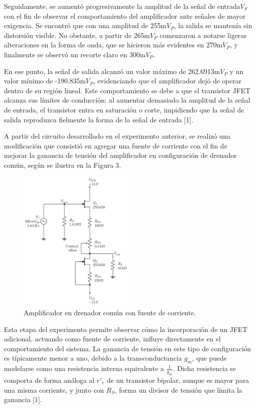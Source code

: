 \documentclass[journal]{IEEEtran}
\begin{document}
\par Seguidamente, se aumentó progresivamente la amplitud de la señal de entrada\( V_S \) con el fin de observar el comportamiento del amplificador ante señales de mayor exigencia. Se encontró que con una amplitud de 255m\( V_P \), la salida se mantenía sin distorsión visible. No obstante, a partir de 265m\( V_P \) comenzaron a notarse ligeras alteraciones en la forma de onda, que se hicieron más evidentes en 270m\( V_P \), y finalmente se observó un recorte claro en 300m\( V_P \).
\par En ese punto, la señal de salida alcanzó un valor máximo de 262.6913m\( V_P \) y un valor mínimo de -190.835m\( V_P \), evidenciando que el amplificador dejó de operar dentro de su región lineal. Este comportamiento se debe a que el transistor JFET alcanza sus límites de conducción: al aumentar demasiado la amplitud de la señal de entrada, el transistor entra en saturación o corte, impidiendo que la señal de salida reproduzca fielmente la forma de la señal de entrada [1].
\par A partir del circuito desarrollado en el experimento anterior, se realizó una modificación que consistió en agregar una fuente de corriente con el fin de mejorar la ganancia de tensión del amplificador en configuración de drenador común, según se ilustra en la Figura 3.
\begin{figure}[H]
    \centering
    \includegraphics[width=0.5\textwidth]{Media/amplificador_fuente_corriente.png}
    \caption{Amplificador en drenador común con fuente de corriente.}
    \label{fig:amplificador_fuente_corriente.}
\end{figure}
\par Esta etapa del experimento permite observar cómo la incorporación de un JFET adicional, actuando como fuente de corriente, influye directamente en el comportamiento del sistema. La ganancia de tensión en este tipo de configuración es típicamente menor a uno, debido a la transconductancia $g_m$, que puede modelarse como una resistencia interna equivalente a $\frac{1}{g_m}$. Dicha resistencia se comporta de forma análoga al $r'_e$ de un transistor bipolar, aunque es mayor para una misma corriente, y junto con $R_S$, forma un divisor de tensión que limita la ganancia [1].
\end{document}

